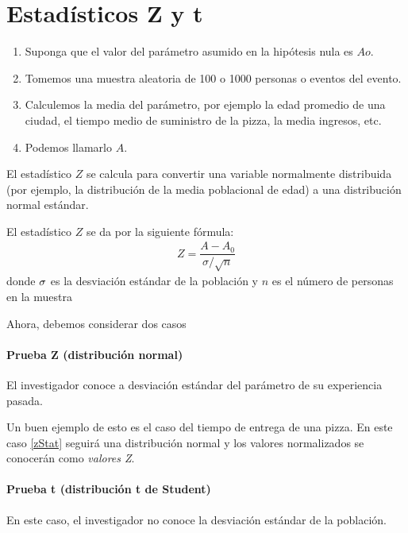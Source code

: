 \section{Estadísticos Z y t}

\begin{enumerate}
	\item Suponga que el valor del parámetro asumido en la hipótesis nula es $Ao$. 
	\item Tomemos
	una muestra aleatoria de 100 o 1000 personas o eventos del evento. 
	\item Calculemos
	la media del parámetro, por ejemplo la edad promedio de una ciudad, el tiempo medio de suministro de la pizza, la media
	ingresos, etc. 
	\item Podemos llamarlo $A$.
\end{enumerate}




El estadístico $Z$ se calcula para convertir una variable normalmente distribuida (por ejemplo, la distribución de la media poblacional de edad) a una distribución normal estándar.


El estadístico $Z$ se da por la siguiente fórmula:
\begin{align}
	\label{zStat}
	Z=\dfrac{A-A_{0}}{{\sigma}/{\sqrt{n}}}
\end{align}
donde $\sigma$ es la desviación estándar de la población y $n$ es el número de personas en la muestra


Ahora, debemos considerar dos casos

\paragraph{Prueba Z (distribución normal)}
El investigador conoce a desviación estándar del parámetro de su experiencia pasada.



Un buen ejemplo de esto es el caso del tiempo de entrega de una pizza.  En este caso \eqref{zStat} seguirá una distribución normal y los valores normalizados se conocerán como \emph{valores Z}.

\paragraph{Prueba t (distribución t de Student) }
En este caso, el investigador no conoce la desviación estándar de la población.



